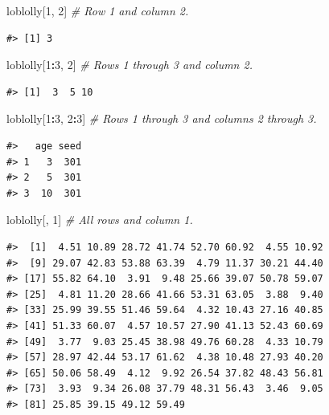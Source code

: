 \documentclass[
  11pt,
]{krantz}
\newenvironment{Shaded}{\begin{snugshade}}{\end{snugshade}}
\newcommand{\CommentTok}[1]{\textcolor[rgb]{0.56,0.35,0.01}{\textit{#1}}}
\newcommand{\DecValTok}[1]{\textcolor[rgb]{0.00,0.00,0.81}{#1}}
\newcommand{\NormalTok}[1]{#1}
\newcommand{\OperatorTok}[1]{\textcolor[rgb]{0.81,0.36,0.00}{\textbf{#1}}}
\theoremstyle{definition}
\theoremstyle{definition}
\theoremstyle{definition}
\theoremstyle{definition}
\theoremstyle{remark}
\begin{document}
\begin{Shaded}
\begin{Highlighting}[]
\NormalTok{loblolly[}\DecValTok{1}\NormalTok{, }\DecValTok{2}\NormalTok{] }\CommentTok{\# Row 1 and column 2.}
\end{Highlighting}
\end{Shaded}

\begin{verbatim}
#> [1] 3
\end{verbatim}

\begin{Shaded}
\begin{Highlighting}[]
\NormalTok{loblolly[}\DecValTok{1}\OperatorTok{:}\DecValTok{3}\NormalTok{, }\DecValTok{2}\NormalTok{] }\CommentTok{\# Rows 1 through 3 and column 2.}
\end{Highlighting}
\end{Shaded}

\begin{verbatim}
#> [1]  3  5 10
\end{verbatim}

\begin{Shaded}
\begin{Highlighting}[]
\NormalTok{loblolly[}\DecValTok{1}\OperatorTok{:}\DecValTok{3}\NormalTok{, }\DecValTok{2}\OperatorTok{:}\DecValTok{3}\NormalTok{] }\CommentTok{\# Rows 1 through 3 and columns 2 through 3.}
\end{Highlighting}
\end{Shaded}

\begin{verbatim}
#>   age seed
#> 1   3  301
#> 2   5  301
#> 3  10  301
\end{verbatim}

\begin{Shaded}
\begin{Highlighting}[]
\NormalTok{loblolly[, }\DecValTok{1}\NormalTok{] }\CommentTok{\# All rows and column 1.}
\end{Highlighting}
\end{Shaded}

\begin{verbatim}
#>  [1]  4.51 10.89 28.72 41.74 52.70 60.92  4.55 10.92
#>  [9] 29.07 42.83 53.88 63.39  4.79 11.37 30.21 44.40
#> [17] 55.82 64.10  3.91  9.48 25.66 39.07 50.78 59.07
#> [25]  4.81 11.20 28.66 41.66 53.31 63.05  3.88  9.40
#> [33] 25.99 39.55 51.46 59.64  4.32 10.43 27.16 40.85
#> [41] 51.33 60.07  4.57 10.57 27.90 41.13 52.43 60.69
#> [49]  3.77  9.03 25.45 38.98 49.76 60.28  4.33 10.79
#> [57] 28.97 42.44 53.17 61.62  4.38 10.48 27.93 40.20
#> [65] 50.06 58.49  4.12  9.92 26.54 37.82 48.43 56.81
#> [73]  3.93  9.34 26.08 37.79 48.31 56.43  3.46  9.05
#> [81] 25.85 39.15 49.12 59.49
\end{verbatim}
\end{document}
